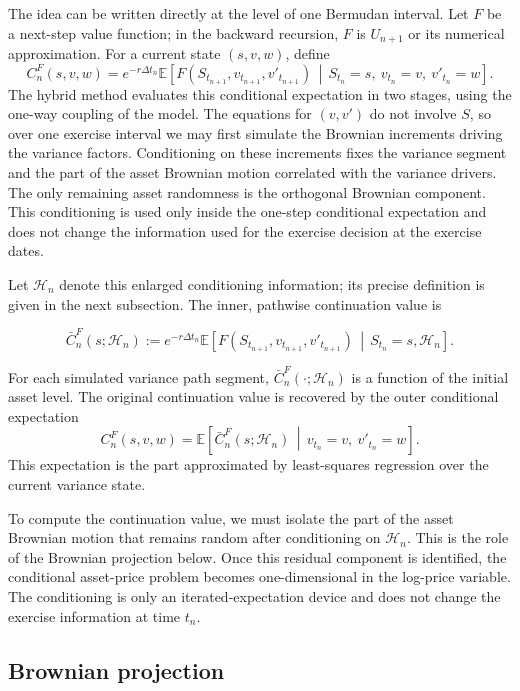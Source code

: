 \documentclass[pdflatex,sn-mathphys-num]{sn-jnl}
\theoremstyle{thmstyleone}%
\theoremstyle{thmstylethree}%
\theoremstyle{thmstyletwo}%
\newcommand{\E}{\mathbb E}
\begin{document}
The idea can be written directly at the level of one Bermudan interval. Let $F$ be
a next-step value function; in the backward recursion, $F$ is $U_{n+1}$ or its
numerical approximation. For a current state $(s,v,w)$, define
$$
C_n^F(s,v,w)
=
e^{-r\Delta t_n}
\E\!\left[
F(S_{t_{n+1}},v_{t_{n+1}},v'_{t_{n+1}})
\,\middle|\,
S_{t_n}=s,\ v_{t_n}=v,\ v'_{t_n}=w
\right].
$$
The hybrid method evaluates this conditional expectation in two stages, using
the one-way coupling of the model. The equations for $(v,v')$ do not involve
$S$, so over one exercise interval we may first simulate the Brownian increments
driving the variance factors. Conditioning on these increments fixes the
variance segment and the part of the asset Brownian motion correlated with the
variance drivers. The only remaining asset randomness is the orthogonal
Brownian component. This conditioning is used only inside the one-step
conditional expectation and does not change the information used for the
exercise decision at the exercise dates.

Let $\mathcal H_n$ denote this enlarged conditioning information; its precise
definition is given in the next subsection. The inner, pathwise continuation value is

\begin{equation}\label{eq:innercontval}
    \bar C_n^F(s;\mathcal H_n):= e^{-r\Delta t_n} \E\!\left[ F(S_{t_{n+1}},v_{t_{n+1}},v'_{t_{n+1}})
\,\middle|\, S_{t_n}=s,\mathcal H_n \right].
\end{equation}

For each simulated variance path segment, $\bar C_n^F(\cdot;\mathcal H_n)$ is a
function of the initial asset level. The original continuation value is recovered by the outer conditional expectation
$$
C_n^F(s,v,w) = \E\!\left[ \bar C_n^F(s;\mathcal H_n) \,\middle|\, v_{t_n}=v,\ v'_{t_n}=w
\right].
$$
This expectation is the part approximated by least-squares regression over the current variance state.

To compute the continuation value, we must isolate the part of the asset Brownian motion that remains random after conditioning on $\mathcal H_n$. This is the role of the Brownian projection below. Once this residual component is identified, the conditional asset-price problem becomes one-dimensional in the log-price variable. The conditioning is only an iterated-expectation device and does not change the exercise information at time $t_n$.

\subsection{Brownian projection}
\end{document}
